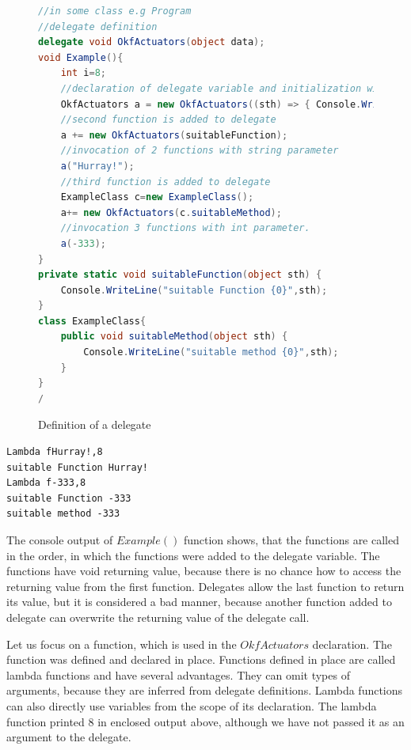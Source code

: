 \documentclass[12pt,notitlepage]{report}
\begin{document}
\begin{figure}[!hbp]
\begin{lstlisting}[language=cs]
//in some class e.g Program
//delegate definition
delegate void OkfActuators(object data);
void Example(){
	int i=8;
	//declaration of delegate variable and initialization with lambda function
	OkfActuators a = new OkfActuators((sth) => { Console.WriteLine("Lambda f{0},{1}",sth,i); });
	//second function is added to delegate
	a += new OkfActuators(suitableFunction);
	//invocation of 2 functions with string parameter
	a("Hurray!");
	//third function is added to delegate
	ExampleClass c=new ExampleClass();
	a+= new OkfActuators(c.suitableMethod);
	//invocation 3 functions with int parameter.
	a(-333);
}
private static void suitableFunction(object sth) { 
	Console.WriteLine("suitable Function {0}",sth);
}
class ExampleClass{
	public void suitableMethod(object sth) { 	
		Console.WriteLine("suitable method {0}",sth);	
	}
}
/\end{lstlisting}
\caption{Definition of a delegate} \label{deleg}
\end{figure}

\begin{verbatim}
Lambda fHurray!,8
suitable Function Hurray!
Lambda f-333,8
suitable Function -333
suitable method -333
\end{verbatim}

	The console output of $Example()$ function shows, that the functions are called in the order, in
	which the functions were added to the delegate variable. 
	The functions have void returning value, because there is no chance how to access
	the returning value from the first function. Delegates allow the last function to return its value, 
	but it is considered a bad manner, because
	another function added to delegate can overwrite the returning value of the delegate call.

	Let us focus on a function, which is used in the $OkfActuators$ declaration. The function 
	was defined and declared in place. Functions defined in place are called lambda functions 
	and have several advantages. 
	They can omit types of arguments, because they are inferred from delegate definitions. Lambda functions
	can also directly use variables from the scope of its declaration. The lambda function printed 8 in enclosed output above,
	although we have not passed it as an argument to the delegate.
\end{document}
